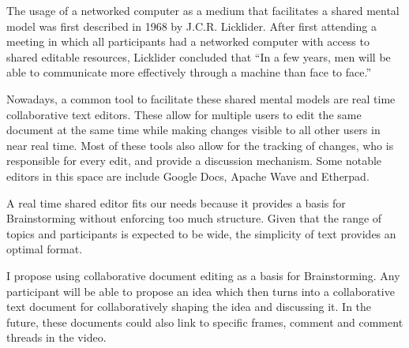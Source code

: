 The usage of a networked computer as a medium that facilitates a shared mental model was first described in 1968 by J.C.R. Licklider. After first attending a meeting in which all participants had a networked computer with access to shared editable resources, Licklider concluded that ``In a few years, men will be able to communicate more effectively through a machine than face to face.''

Nowadays, a common tool to facilitate these shared mental models are real time collaborative text editors. These allow for multiple users to edit the same document at the same time while making changes visible to all other users in near real time. Most of these tools also allow for the tracking of changes, who is responsible for every edit, and provide a discussion mechanism. Some notable editors in this space are include Google Docs, Apache Wave and Etherpad. 

A real time shared editor fits our needs because it provides a basis for Brainstorming without enforcing too much structure. Given that the range of topics and participants is expected to be wide, the simplicity of text provides an optimal format. 

I propose using collaborative document editing as a basis for Brainstorming. Any participant will be able to propose an idea which then turns into a collaborative text document for collaboratively shaping the idea and discussing it. In the future, these documents could also link to specific frames, comment and comment threads in the video. 